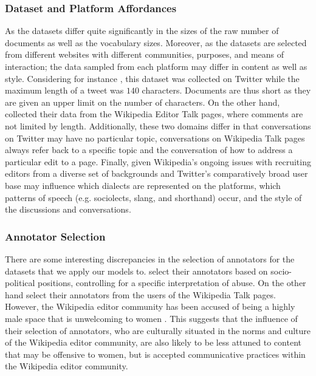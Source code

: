 \subsubsection{Dataset and Platform Affordances}

As the datasets differ quite significantly in the sizes of the raw number of documents as well as the vocabulary sizes. Moreover, as the datasets are selected from different websites with different communities, purposes, and means of interaction; the data sampled from each platform may differ in content as well as style. Considering for instance \citet{Waseem:2016}, this dataset was collected on Twitter while the maximum length of a tweet was $140$ characters. Documents are thus short as they are given an upper limit on the number of characters. On the other hand, \citet{Wulczyn:2017} collected their data from the Wikipedia Editor Talk pages, where comments are not limited by length. Additionally, these two domains differ in that conversations on Twitter may have no particular topic, conversations on Wikipedia Talk pages always refer back to a specific topic and the conversation of how to address a particular edit to a page. Finally, given Wikipedia's ongoing issues with recruiting editors from a diverse set of backgrounds \cite{CITE: Wikipedia editors issue} and Twitter's comparatively broad user base \cite{CITE: Twitter userbase by demographic ref} may influence which dialects are represented on the platforms, which patterns of speech (e.g. sociolects, slang, and shorthand) occur, and the style of the discussions and conversations.

\subsubsection{Annotator Selection}

There are some interesting discrepancies in the selection of annotators for the datasets that we apply our models to. \citet{Waseem:2016} select their annotators based on socio-political positions, controlling for a specific interpretation of abuse. On the other hand \citet{Wulczyn:2017} select their annotators from the users of the Wikipedia Talk pages. However, the Wikipedia editor community has been accused of being a highly male space that is unwelcoming to women \cite{CITE: Cite article talking about anti-women culture on wikipedia}. This suggests that the influence of their selection of annotators, who are culturally situated in the norms and culture of the Wikipedia editor community, are also likely to be less attuned to content that may be offensive to women, but is accepted communicative practices within the Wikipedia editor community.

